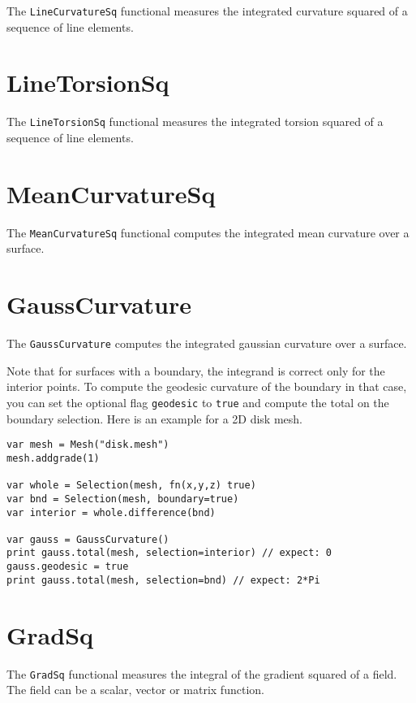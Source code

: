 The \texttt{LineCurvatureSq} functional measures the integrated
curvature squared of a sequence of line elements.

\hypertarget{linetorsionsq}{%
\section{LineTorsionSq}\label{linetorsionsq}}

The \texttt{LineTorsionSq} functional measures the integrated torsion
squared of a sequence of line elements.

\hypertarget{meancurvaturesq}{%
\section{MeanCurvatureSq}\label{meancurvaturesq}}

The \texttt{MeanCurvatureSq} functional computes the integrated mean
curvature over a surface.

\hypertarget{gausscurvature}{%
\section{GaussCurvature}\label{gausscurvature}}

The \texttt{GaussCurvature} computes the integrated gaussian curvature
over a surface.

Note that for surfaces with a boundary, the integrand is correct only
for the interior points. To compute the geodesic curvature of the
boundary in that case, you can set the optional flag \texttt{geodesic}
to \texttt{true} and compute the total on the boundary selection. Here
is an example for a 2D disk mesh.

\begin{lstlisting}
var mesh = Mesh("disk.mesh")
mesh.addgrade(1)

var whole = Selection(mesh, fn(x,y,z) true)
var bnd = Selection(mesh, boundary=true)
var interior = whole.difference(bnd)

var gauss = GaussCurvature()
print gauss.total(mesh, selection=interior) // expect: 0
gauss.geodesic = true
print gauss.total(mesh, selection=bnd) // expect: 2*Pi
\end{lstlisting}

\hypertarget{gradsq}{%
\section{GradSq}\label{gradsq}}

The \texttt{GradSq} functional measures the integral of the gradient
squared of a field. The field can be a scalar, vector or matrix
function.

